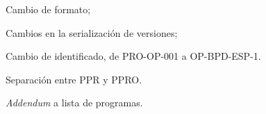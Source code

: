 \begin{changelog}[simple, sectioncmd=\subsection*]
	\begin{version}[v=2.1, date=2023-01, author=Pablo E. Alanis]
			\item Cambio de formato;
			\item Cambios en la serialización de versiones;
			\item Cambio de identificado, de PRO-OP-001 a OP-BPD-ESP-1.
			\item Separación entre PPR y PPRO.
	\end{version}

	\begin{version}[v=1.9, date=2022-05, author=Alonso M.]
		\item \textit{Addendum} a lista de programas.
	\end{version}
\end{changelog}